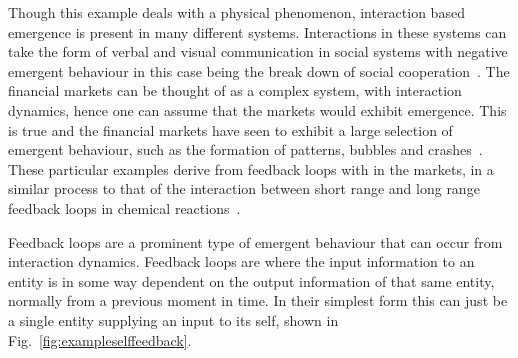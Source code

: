 \documentclass{article}
\begin{document}
Though this example deals with a physical phenomenon, interaction based emergence is present in many different systems. Interactions in these systems can take the form of verbal and visual communication in social systems with negative emergent behaviour in this case being the break down of social cooperation~\cite{socialemrgence}. The financial markets can be thought of as a complex system, with interaction dynamics, hence one can assume that the markets would exhibit emergence. This is true and the financial markets have seen to exhibit a large selection of emergent behaviour, such as the formation of patterns, bubbles and crashes~\cite{bubblesandcrashes}. These particular examples derive from feedback loops with in the markets, in a similar process to that of the interaction between short range and long range feedback loops in chemical reactions~\cite{turningchemical}.     

Feedback loops are a prominent type of emergent behaviour that can occur from interaction dynamics. Feedback loops are where the input information to an entity is in some way dependent on the output information of that same entity, normally from a previous moment in time. In their simplest form this can just be a single entity supplying an input to its self, shown in Fig.~\ref{fig:exampleselffeedback}.
\end{document}
